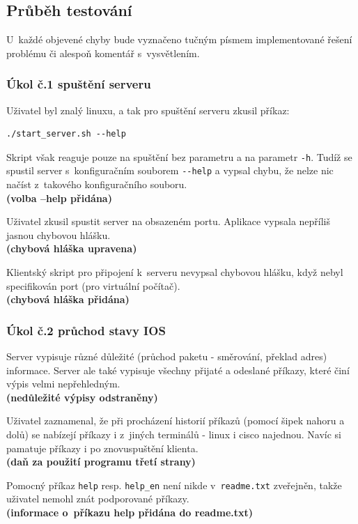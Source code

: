 \subsection{Průběh testování}
U~každé objevené chyby bude vyznačeno tučným písmem implementované řešení problému či alespoň komentář s~vysvětlením. 

\subsubsection{Úkol č.1 spuštění serveru}
Uživatel byl znalý linuxu, a tak pro spuštění serveru zkusil příkaz:
\begin{verbatim}
./start_server.sh --help
\end{verbatim}
Skript však reaguje pouze na spuštění bez parametru a na parametr \verb|-h|. Tudíž se spustil server s~konfiguračním souborem \verb|--help| a vypsal chybu, že nelze nic načíst z~takového konfiguračního souboru.
\\\textbf{(volba --help přidána)}

Uživatel zkusil spustit server na obsazeném portu. Aplikace vypsala nepříliš jasnou chybovou hlášku.
\\\textbf{(chybová hláška upravena)}

Klientský skript pro připojení k~serveru nevypsal chybovou hlášku, když nebyl specifikován port (pro virtuální počítač).
\\\textbf{(chybová hláška přidána)}

\subsubsection{Úkol č.2 průchod stavy IOS}
Server vypisuje různé důležité (průchod paketu - směrování, překlad adres) informace. Server ale také vypisuje všechny přijaté a odeslané příkazy, které činí výpis velmi nepřehledným.
\\\textbf{(nedůležité výpisy odstraněny)}

Uživatel zaznamenal, že při procházení historií příkazů (pomocí šipek nahoru a dolů) se nabízejí příkazy i z~jiných terminálů - linux i cisco najednou. Navíc si pamatuje příkazy i po znovuspuštění klienta.
\\\textbf{(daň za použití programu třetí strany)}

Pomocný příkaz \verb|help| resp. \verb|help_en| není nikde v~\verb|readme.txt| zveřejněn, takže uživatel nemohl znát podporované příkazy.
\\\textbf{(informace o~příkazu help přidána do readme.txt)}

